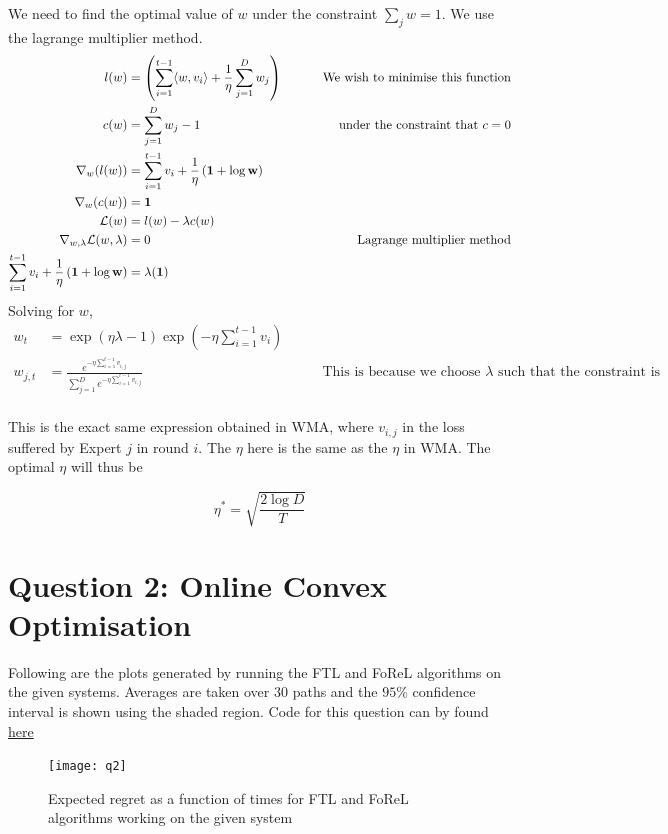 \documentclass{article}
\begin{document}
We need to find the optimal value of $w$ under the constraint $\sum_j w = 1$. We use the lagrange multiplier method.
\begin{align*}
    l(w) &= \left( \sum_{i=1}^{t-1} \langle w,v_i \rangle + \frac{1}{\eta} \sum_{j=1}^{D} w_j \right)\ &\qquad \text{We wish to minimise this function}\\
    c(w) &= \sum_{j=1}^{D} w_j - 1 &\qquad \text{under the constraint that $c=0$}\\
    \nabla_w(l(w)) &=\sum_{i=1}^{t-1} v_i + \frac{1}{\eta}\left( \bf{1} + \log w \right) \\
    \nabla_w(c(w)) &= \bf{1}\\
    \mathcal{L}(w) &= l(w) - \lambda c(w) \\
    \nabla_{w,\lambda}\mathcal{L}(w,\lambda) &= 0  &\qquad \text{Lagrange multiplier method}\\
    \sum_{i=1}^{t-1} v_i + \frac{1}{\eta}\left( \bf{1} + \log w \right) &= \lambda(\bf{1})
\end{align*}
Solving for $w$,
\begin{align*}
    w_t &= \exp (\eta \lambda - 1) \exp (-\eta \sum_{i=1}^{t-1}v_i)\\
    w_{j,t}    &= \frac{e^{-\eta \sum_{i=1}^{t-1}v_{i,j}}}{\sum_{j=1}^{D}e^{-\eta \sum_{i=1}^{t-1}v_{i,j}}} &\qquad \text{This is because we choose $\lambda$ such that the constraint is satisfied}\\
\end{align*}

This is the exact same expression obtained in WMA, where $v_{i,j}$ in the loss suffered by Expert $j$ in round $i$. The $\eta$ here is the same as the $\eta$ in WMA. The optimal $\eta$ will thus be

\[
    \eta^* = \sqrt{\frac{2 \log D}{T}}
    \]

\newpage
\section*{Question 2: Online Convex Optimisation}
Following are the plots generated by running the FTL and FoReL algorithms on the given systems. Averages are taken over $30$ paths and the $95\%$ confidence interval is shown using the shaded region. Code for this question can by found \href{run:./code/Q2_3.py}{here} 

\begin{figure}[h!]
\centering
\texttt{[image: q2]}
\caption{Expected regret as a function of times for FTL and FoReL algorithms working on the given system}
\end{figure}
\end{document}
